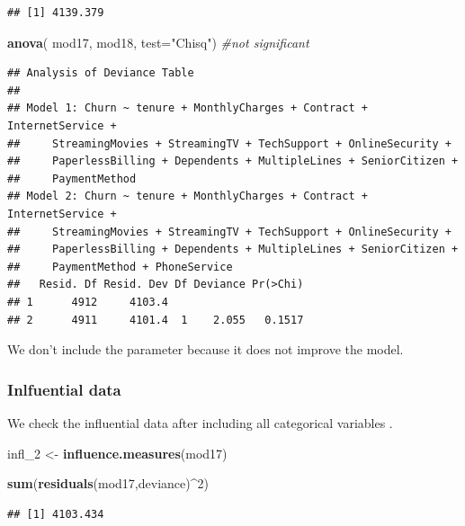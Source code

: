 \documentclass[
  twoside]{article}
\newenvironment{Shaded}{\begin{snugshade}}{\end{snugshade}}
\newcommand{\AttributeTok}[1]{\textcolor[rgb]{0.13,0.29,0.53}{#1}}
\newcommand{\CommentTok}[1]{\textcolor[rgb]{0.56,0.35,0.01}{\textit{#1}}}
\newcommand{\DecValTok}[1]{\textcolor[rgb]{0.00,0.00,0.81}{#1}}
\newcommand{\FunctionTok}[1]{\textcolor[rgb]{0.13,0.29,0.53}{\textbf{#1}}}
\newcommand{\NormalTok}[1]{#1}
\newcommand{\OtherTok}[1]{\textcolor[rgb]{0.56,0.35,0.01}{#1}}
\newcommand{\SpecialCharTok}[1]{\textcolor[rgb]{0.81,0.36,0.00}{\textbf{#1}}}
\newcommand{\StringTok}[1]{\textcolor[rgb]{0.31,0.60,0.02}{#1}}
\begin{document}
\begin{verbatim}
## [1] 4139.379
\end{verbatim}

\begin{Shaded}
\begin{Highlighting}[]
\FunctionTok{anova}\NormalTok{( mod17, mod18,  }\AttributeTok{test=}\StringTok{"Chisq"}\NormalTok{) }\CommentTok{\#not significant}
\end{Highlighting}
\end{Shaded}

\begin{verbatim}
## Analysis of Deviance Table
## 
## Model 1: Churn ~ tenure + MonthlyCharges + Contract + InternetService + 
##     StreamingMovies + StreamingTV + TechSupport + OnlineSecurity + 
##     PaperlessBilling + Dependents + MultipleLines + SeniorCitizen + 
##     PaymentMethod
## Model 2: Churn ~ tenure + MonthlyCharges + Contract + InternetService + 
##     StreamingMovies + StreamingTV + TechSupport + OnlineSecurity + 
##     PaperlessBilling + Dependents + MultipleLines + SeniorCitizen + 
##     PaymentMethod + PhoneService
##   Resid. Df Resid. Dev Df Deviance Pr(>Chi)
## 1      4912     4103.4                     
## 2      4911     4101.4  1    2.055   0.1517
\end{verbatim}

We don't include the parameter because it does not improve the model.

\hypertarget{inlfuential-data-1}{%
\subsubsection{Inlfuential data}\label{inlfuential-data-1}}

We check the influential data after including all categorical variables
.

\begin{Shaded}
\begin{Highlighting}[]
\NormalTok{infl\_2 }\OtherTok{\textless{}{-}} \FunctionTok{influence.measures}\NormalTok{(mod17)}

\FunctionTok{sum}\NormalTok{(}\FunctionTok{residuals}\NormalTok{(mod17,}\StringTok{\textquotesingle{}deviance\textquotesingle{}}\NormalTok{)}\SpecialCharTok{\^{}}\DecValTok{2}\NormalTok{)}
\end{Highlighting}
\end{Shaded}

\begin{verbatim}
## [1] 4103.434
\end{verbatim}
\end{document}
